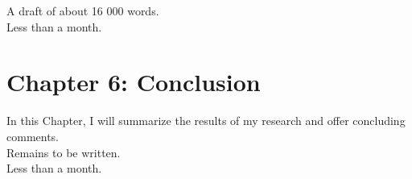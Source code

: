 \documentclass[12pt,a4paper]{article} %
\begin{document}
 A draft of about 16 000 words. \\

 Less than a month.

\section*{Chapter 6: Conclusion}\label{chap:6}

In this Chapter, I will summarize the results of my research and offer concluding comments. \\

 Remains to be written. \\

 Less than a month.
\end{document}
